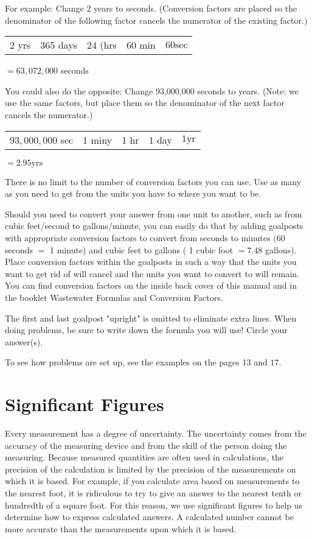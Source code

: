 \begin{enumerate}
For example: Change 2 years to seconds. (Conversion factors are placed so the denominator of the following factor cancels the numerator of the existing factor.)

\begin{tabular}{c|c|c|c|c|}
2 yrs & 365 days & 24 (hrs & 60 min & $60 \mathrm{sec}$ \\
\end{tabular}$=63,072,000$ seconds

You could also do the opposite: Change 93,000,000 seconds to years. (Note: we use the same factors, but place them so the denominator of the next factor cancels the numerator.)

\begin{tabular}{l|c|c|c|c|}
$93,000,000$ sec & 1 miny & 1 hr & 1 day & $1 \mathrm{yr}$ \\
\end{tabular}$=2.95 \mathrm{yrs}$

There is no limit to the number of conversion factors you can use. Use as many as you need to get from the units you have to where you want to be.

Should you need to convert your answer from one unit to another, such as from cubic feet/second to gallons/minute, you can easily do that by adding goalposts with appropriate conversion factors to convert from seconds to minutes $(60$ seconds $=$ 1 minute) and cubic feet to gallons ( 1 cubic foot $=7.48$ gallons). Place conversion factors within the goalposts in such a way that the units you want to get rid of will cancel and the units you want to convert to will remain. You can find conversion factors on the inside back cover of this manual and in the booklet Wastewater Formulas and Conversion Factors.

The first and last goalpost "upright" is omitted to eliminate extra lines. When doing problems, be sure to write down the formula you will use! Circle your answer(s).

To see how problems are set up, see the examples on the pages 13 and $17 .$

\section{Significant Figures}
Every measurement has a degree of uncertainty. The uncertainty comes from the accuracy of the measuring device and from the skill of the person doing the measuring. Because measured quantities are often used in calculations, the precision of the calculation is limited by the precision of the measurements on which it is based. For example, if you calculate area based on measurements to the nearest foot, it is ridiculous to try to give an answer to the nearest tenth or hundredth of a square foot. For this reason, we use significant figures to help us determine how to express calculated answers. A calculated number cannot be more accurate than the measurements upon which it is based.


\end{enumerate}
